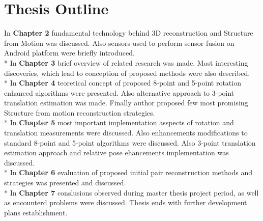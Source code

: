 \section{Thesis Outline}
In \textbf{Chapter 2} fundamental technology behind 3D reconstruction and Structure from Motion was discussed. Also sensors used to perform sensor fusion on Android platform were briefly introduced.
\\*
In \textbf{Chapter 3} brief overview of related research was made. Most interesting discoveries, which lead to conception of proposed methods were also described. 
\\*
In \textbf{Chapter 4} teoretical concept of proposed 8-point and 5-point rotation enhanced algorithms were presented. Also alternative approach to 3-point translation estimation was made. Finally author proposed few most promising Structure from motion reconstruction strategies.
\\*
In \textbf{Chapter 5} most important implementation asspects of rotation and translation measurements were discussed. Also enhancements modifications to standard 8-point and 5-point algorithms were discussed. Also 3-point translation estimation approach and relative pose ehancements implementation was discussed.
\\*
In \textbf{Chapter 6} evaluation of proposed initial pair reconstruction methods and strategies was presented and discussed.
\\*
In \textbf{Chapter 7} conslusions observed during master thesis project period, as well as encounterd problems were discussed. Thesis ends with further development plans establishment.




